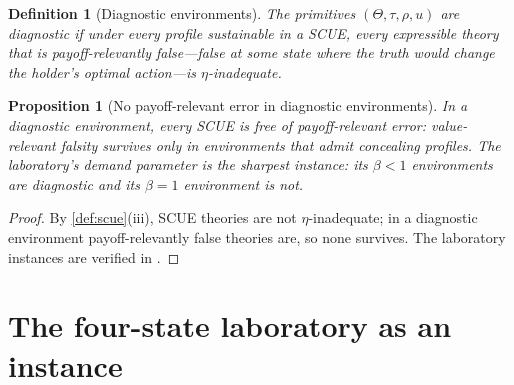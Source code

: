 \documentclass[11pt]{article}
\newtheorem{definition}[assumption]{Definition}
\newtheorem{proposition}[assumption]{Proposition}
\begin{document}
\begin{definition}[Diagnostic environments]
\label{def:diagnostic}
The primitives $(\Theta,\tau,\rho,u)$ are \emph{diagnostic} if under every
profile sustainable in a SCUE, every expressible theory that is payoff-relevantly
false---false at some state where the truth would change the holder's
optimal action---is $\eta$-inadequate.
\end{definition}

\begin{proposition}[No payoff-relevant error in diagnostic environments]
\label{prop:diagnostic}
In a diagnostic environment, every SCUE is free of payoff-relevant error:
value-relevant falsity survives only in environments that admit concealing
profiles.  The laboratory's demand parameter is the sharpest instance: its
$\beta<1$ environments are diagnostic and its $\beta=1$ environment is not.
\end{proposition}

\begin{proof}
By \cref{def:scue}(iii), SCUE theories are not $\eta$-inadequate; in a
diagnostic environment payoff-relevantly false theories are, so none
survives.  The laboratory instances are verified in \citep{FourStateNote}.
\end{proof}

\section{The four-state laboratory as an instance}
\label{sec:instance}
\end{document}
